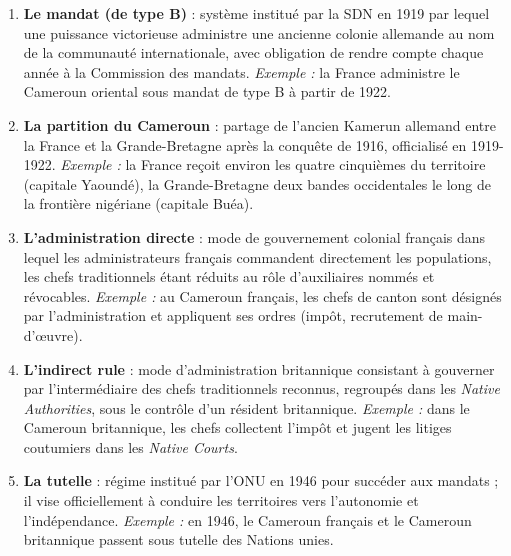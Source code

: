 \documentclass[11pt]{article}
\begin{document}
\begin{corrige}
\begin{enumerate}
\item \textbf{Le mandat (de type B)} : système institué par la SDN en 1919 par lequel une puissance victorieuse administre une ancienne colonie allemande au nom de la communauté internationale, avec obligation de rendre compte chaque année à la Commission des mandats. \emph{Exemple :} la France administre le Cameroun oriental sous mandat de type B à partir de 1922.
\item \textbf{La partition du Cameroun} : partage de l'ancien Kamerun allemand entre la France et la Grande-Bretagne après la conquête de 1916, officialisé en 1919-1922. \emph{Exemple :} la France reçoit environ les quatre cinquièmes du territoire (capitale Yaoundé), la Grande-Bretagne deux bandes occidentales le long de la frontière nigériane (capitale Buéa).
\item \textbf{L'administration directe} : mode de gouvernement colonial français dans lequel les administrateurs français commandent directement les populations, les chefs traditionnels étant réduits au rôle d'auxiliaires nommés et révocables. \emph{Exemple :} au Cameroun français, les chefs de canton sont désignés par l'administration et appliquent ses ordres (impôt, recrutement de main-d'œuvre).
\item \textbf{L'indirect rule} : mode d'administration britannique consistant à gouverner par l'intermédiaire des chefs traditionnels reconnus, regroupés dans les \emph{Native Authorities}, sous le contrôle d'un résident britannique. \emph{Exemple :} dans le Cameroun britannique, les chefs collectent l'impôt et jugent les litiges coutumiers dans les \emph{Native Courts}.
\item \textbf{La tutelle} : régime institué par l'ONU en 1946 pour succéder aux mandats ; il vise officiellement à conduire les territoires vers l'autonomie et l'indépendance. \emph{Exemple :} en 1946, le Cameroun français et le Cameroun britannique passent sous tutelle des Nations unies.
\end{enumerate}
\end{corrige}
\end{document}
